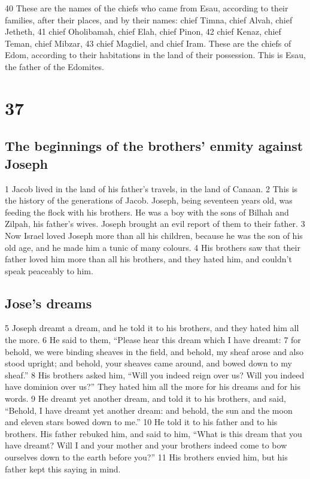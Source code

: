 {40} These are the names of the chiefs who came from Esau, according to
their families, after their places, and by their names: chief Timna,
chief Alvah, chief Jetheth, {41} chief Oholibamah, chief Elah, chief
Pinon, {42} chief Kenaz, chief Teman, chief Mibzar, {43} chief Magdiel,
and chief Iram. These are the chiefs of Edom, according to their
habitations in the land of their possession. This is Esau, the father of
the Edomites.

\hypertarget{section-36}{%
\section{37}\label{section-36}}

\hypertarget{the-beginnings-of-the-brothers-enmity-against-joseph}{%
\subsection{The beginnings of the brothers' enmity against
Joseph}\label{the-beginnings-of-the-brothers-enmity-against-joseph}}

{1} Jacob lived in the land of his father's travels, in the land of
Canaan. {2} This is the history of the generations of Jacob. Joseph,
being seventeen years old, was feeding the flock with his brothers. He
was a boy with the sons of Bilhah and Zilpah, his father's wives. Joseph
brought an evil report of them to their father. {3} Now Israel loved
Joseph more than all his children, because he was the son of his old
age, and he made him a tunic of many colours. {4} His brothers saw that
their father loved him more than all his brothers, and they hated him,
and couldn't speak peaceably to him.

\hypertarget{joses-dreams}{%
\subsection{Jose's dreams}\label{joses-dreams}}

{5} Joseph dreamt a dream, and he told it to his brothers, and they
hated him all the more. {6} He said to them, ``Please hear this dream
which I have dreamt: {7} for behold, we were binding sheaves in the
field, and behold, my sheaf arose and also stood upright; and behold,
your sheaves came around, and bowed down to my sheaf.'' {8} His brothers
asked him, ``Will you indeed reign over us? Will you indeed have
dominion over us?'' They hated him all the more for his dreams and for
his words. {9} He dreamt yet another dream, and told it to his brothers,
and said, ``Behold, I have dreamt yet another dream: and behold, the sun
and the moon and eleven stars bowed down to me.'' {10} He told it to his
father and to his brothers. His father rebuked him, and said to him,
``What is this dream that you have dreamt? Will I and your mother and
your brothers indeed come to bow ourselves down to the earth before
you?'' {11} His brothers envied him, but his father kept this saying in
mind.

